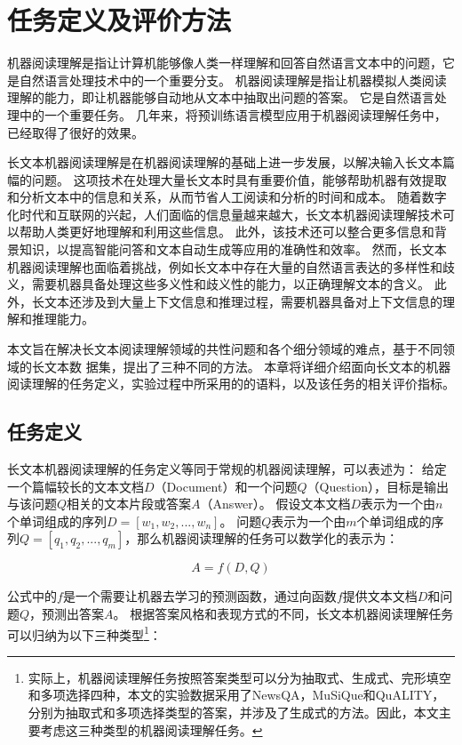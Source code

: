 \chapter{任务定义及评价方法}
机器阅读理解是指让计算机能够像人类一样理解和回答自然语言文本中的问题，它是自然语言处理技术中的一个重要分支。
机器阅读理解是指让机器模拟人类阅读理解的能力，即让机器能够自动地从文本中抽取出问题的答案。
它是自然语言处理中的一个重要任务。
几年来，将预训练语言模型应用于机器阅读理解任务中，已经取得了很好的效果。

长文本机器阅读理解是在机器阅读理解的基础上进一步发展，以解决输入长文本篇幅的问题。
这项技术在处理大量长文本时具有重要价值，能够帮助机器有效提取和分析文本中的信息和关系，从而节省人工阅读和分析的时间和成本。
随着数字化时代和互联网的兴起，人们面临的信息量越来越大，长文本机器阅读理解技术可以帮助人类更好地理解和利用这些信息。
此外，该技术还可以整合更多信息和背景知识，以提高智能问答和文本自动生成等应用的准确性和效率。
然而，长文本机器阅读理解也面临着挑战，例如长文本中存在大量的自然语言表达的多样性和歧义，需要机器具备处理这些多义性和歧义性的能力，以正确理解文本的含义。
此外，长文本还涉及到大量上下文信息和推理过程，需要机器具备对上下文信息的理解和推理能力。

本文旨在解决长文本阅读理解领域的共性问题和各个细分领域的难点，基于不同领域的长文本数
据集，提出了三种不同的方法。
本章将详细介绍面向长文本的机器阅读理解的任务定义，实验过程中所采用的的语料，以及该任务的相关评价指标。

\section{任务定义}
长文本机器阅读理解的任务定义等同于常规的机器阅读理解，可以表述为：
给定一个篇幅较长的文本文档$D$（Document）和一个问题$Q$（Question），目标是输出与该问题$Q$相关的文本片段或答案$A$（Answer）。
假设文本文档$D$表示为一个由$n$个单词组成的序列$D = [w_1, w_2, ..., w_n]$。
问题$Q$表示为一个由$m$个单词组成的序列$Q = [q_1, q_2, ..., q_m]$，那么机器阅读理解的任务可以数学化的表示为：

$$A = f(D, Q)$$

公式中的$f$是一个需要让机器去学习的预测函数，通过向函数$f$提供文本文档$D$和问题$Q$，预测出答案$A$。
根据答案风格和表现方式的不同，长文本机器阅读理解任务可以归纳为以下三种类型\footnote{实际上，机器阅读理解任务按照答案类型可以分为抽取式、生成式、完形填空和多项选择四种，本文的实验数据采用了NewsQA，MuSiQue和QuALITY，分别为抽取式和多项选择类型的答案，并涉及了生成式的方法。因此，本文主要考虑这三种类型的机器阅读理解任务。}：

